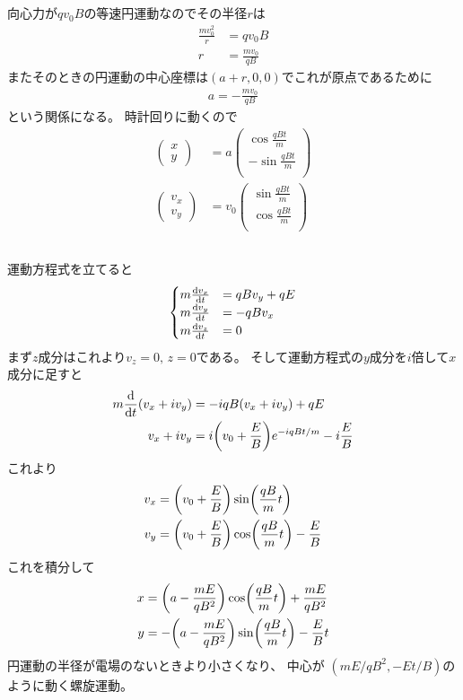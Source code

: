 \documentclass[../../master.tex]{subfiles}
\begin{document}
\subsection{}
向心力が\(qv_0B\)の等速円運動なのでその半径\(r\)は
\begin{align}
    \frac{mv_0^2}{r} &= qv_0 B\\
    r &= \frac{mv_0}{qB}
\end{align}
またそのときの円運動の中心座標は\((a+r,0,0)\)でこれが原点であるために
\begin{align}
    a = -\frac{mv_0}{qB}
\end{align}
という関係になる。
時計回りに動くので
\begin{align}
    \begin{pmatrix}
        x\\y
    \end{pmatrix}
    &= a\begin{pmatrix}
        \cos\frac{qB t}{m}\\
        -\sin\frac{qB t}{m}\\
    \end{pmatrix}\\
    \begin{pmatrix}
        v_x\\v_y
    \end{pmatrix}
    &= v_0\begin{pmatrix}
        \sin\frac{qB t}{m}\\
        \cos\frac{qB t}{m}\\
    \end{pmatrix}
\end{align}

\subsection{}
運動方程式を立てると
\begin{align}
    \begin{cases}
        m\dv{v_x}{t} &= qB v_y +qE\\
        m\dv{v_y}{t} &= -qB v_x\\
        m\dv{v_z}{t} &= 0
    \end{cases}
\end{align}
まず\(z\)成分はこれより\(v_z=0,\,z=0\)である。
そして運動方程式の\(y\)成分を\(i\)倍して\(x\)成分に足すと
\begin{align}
    m\dv{t} (v_x+iv_y) &= -iqB(v_x+iv_y) +qE\\
    v_x + iv_y &= i\qty(v_0+\frac{E}{B}) e^{-iqBt/m} - i\frac{E}{B}
\end{align}
これより
\begin{align}
    v_x &= \qty(v_0+\frac{E}{B}) \sin(\frac{qB}{m}t)\\
    v_y &= \qty(v_0+\frac{E}{B}) \cos(\frac{qB}{m}t) - \frac{E}{B}
\end{align}
これを積分して
\begin{align}
    x &= \qty(a-\frac{mE}{qB^2}) \cos(\frac{qB}{m}t)+\frac{mE}{qB^2}\\
    y &= -\qty(a-\frac{mE}{qB^2}) \sin(\frac{qB}{m}t)-\frac{E}{B}t
\end{align}
円運動の半径が電場のないときより小さくなり、
中心が \((mE/qB^2, -Et/B)\)のように動く螺旋運動。
\end{document}

